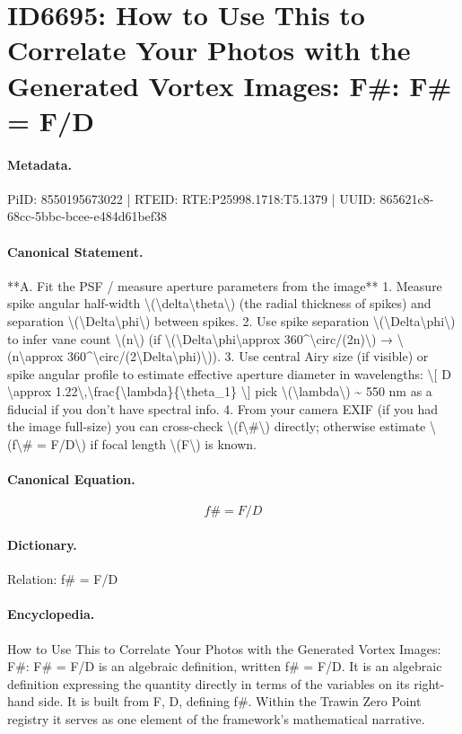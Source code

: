 \section*{ID6695: How to Use This to Correlate Your Photos with the Generated Vortex Images: F\#: F\# = F/D}
\paragraph{Metadata.}
PiID: 8550195673022 | RTEID: RTE:P25998.1718:T5.1379 | UUID: 865621c8-68cc-5bbc-bcee-e484d61bef38

\paragraph{Canonical Statement.}
**A. Fit the PSF / measure aperture parameters from the image** 1. Measure spike angular half-width \textbackslash{}(\textbackslash{}delta\textbackslash{}theta\textbackslash{}) (the radial thickness of spikes) and separation \textbackslash{}(\textbackslash{}Delta\textbackslash{}phi\textbackslash{}) between spikes. 2. Use spike separation \textbackslash{}(\textbackslash{}Delta\textbackslash{}phi\textbackslash{}) to infer vane count \textbackslash{}(n\textbackslash{}) (if \textbackslash{}(\textbackslash{}Delta\textbackslash{}phi\textbackslash{}approx 360\textasciicircum{}\textbackslash{}circ/(2n)\textbackslash{}) → \textbackslash{}(n\textbackslash{}approx 360\textasciicircum{}\textbackslash{}circ/(2\textbackslash{}Delta\textbackslash{}phi)\textbackslash{})). 3. Use central Airy size (if visible) or spike angular profile to estimate effective aperture diameter in wavelengths: \textbackslash{}[ D \textbackslash{}approx 1.22\textbackslash{},\textbackslash{}frac\{\textbackslash{}lambda\}\{\textbackslash{}theta\_1\} \textbackslash{}] pick \textbackslash{}(\textbackslash{}lambda\textbackslash{}) \textasciitilde{} 550 nm as a fiducial if you don’t have spectral info. 4. From your camera EXIF (if you had the image full-size) you can cross-check \textbackslash{}(f\textbackslash{}\#\textbackslash{}) directly; otherwise estimate \textbackslash{}(f\textbackslash{}\# = F/D\textbackslash{}) if focal length \textbackslash{}(F\textbackslash{}) is known.

\paragraph{Canonical Equation.}
\[
f\# = F/D
\]

\paragraph{Dictionary.}
Relation: f\# = F/D

\paragraph{Encyclopedia.}
How to Use This to Correlate Your Photos with the Generated Vortex Images: F\#: F\# = F/D is an algebraic definition, written f\# = F/D. It is an algebraic definition expressing the quantity directly in terms of the variables on its right-hand side. It is built from F, D, defining f\#. Within the Trawin Zero Point registry it serves as one element of the framework's mathematical narrative.
